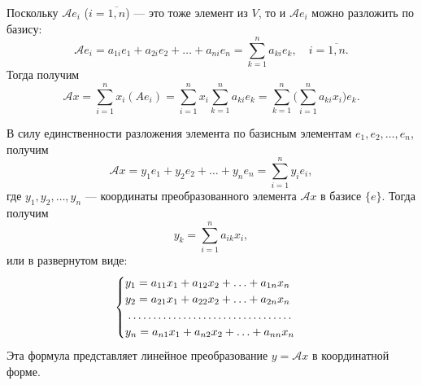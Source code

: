 \documentclass[a5paper, 11pt]{extbook}
\theoremstyle{definition}
\theoremstyle{definition}
\begin{document}
Поскольку \(\mathcal{A} e_i\) (\(i = \overline{1,n}\)) — это тоже элемент из \(V\), то и \(\mathcal{A} e_i\) можно разложить по базису:
\[
    \mathcal{A} e_i =
    a_{1i} e_1 + a_{2i} e_2 + \ldots + a_{ni} e_n =
    \sum_{k = 1}^n a_{ki} e_k, \quad i = \overline{1, n}.
\]
Тогда получим
\[
    \mathcal{A} x =
    \sum_{i = 1}^n x_i (A e_i) =
    \sum_{i = 1}^ n x_i \sum_{k = 1}^n a_{ki} e_k =
    \sum_{k = 1}^ n \Big( \sum_{i = 1}^n a_{ki} x_i \Big) e_k.
\]

В силу единственности разложения элемента по базисным элементам \(e_1, e_2, \ldots, e_n\), получим
\[
    \mathcal{A} x =
    y_1 e_1 + y_2 e_2 + \ldots + y_n e_n =
    \sum_{i = 1}^n y_i e_i,
\]
где \(y_1, y_2, \ldots, y_n\) — координаты преобразованного элемента \(\mathcal{A} x\) в базисе \(\{e\}\). Тогда получим
\[
    y_k = \sum_{i = 1}^n a_{ik} x_i,
\]
или в развернутом виде:
\[
    \begin{cases}
        y_1 = a_{11} x_1 + a_{12} x_2 + \ldots + a_{1n} x_n \\
        y_2 = a_{21} x_1 + a_{22} x_2 + \ldots + a_{2n} x_n \\
        \dotfill                                            \\
        y_n = a_{n1} x_1 + a_{n2} x_2 + \ldots + a_{nn} x_n \\
    \end{cases}
\]
Эта формула представляет линейное преобразование \(y = \mathcal{A} x\) в координатной форме.
\end{document}
